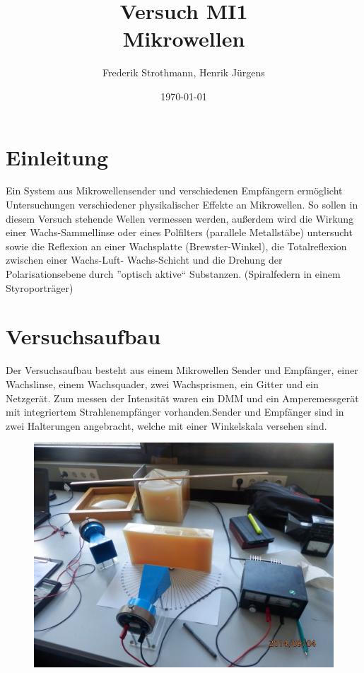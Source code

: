 \documentclass[12pt]{scrartcl}
\title{Versuch MI1\\ Mikrowellen}
\author{Frederik Strothmann, Henrik Jürgens}
\date{\today}
\begin{document}

\maketitle
\tableofcontents
\newpage


\section{Einleitung}

Ein System aus Mikrowellensender und verschiedenen Empfängern ermöglicht Untersuchungen verschiedener physikalischer Effekte an Mikrowellen. So sollen in diesem Versuch stehende Wellen vermessen werden, außerdem wird die Wirkung einer Wachs-Sammellinse oder eines Polfilters (parallele Metallstäbe) untersucht sowie die Reflexion
an einer Wachsplatte (Brewster-Winkel), die Totalreflexion zwischen einer Wachs-Luft-
Wachs-Schicht und die Drehung der Polarisationsebene durch
”optisch aktive“ Substanzen.
(Spiralfedern in einem Styroporträger)

\section{Versuchsaufbau}
Der Versuchsaufbau besteht aus einem Mikrowellen Sender und Empfänger, einer Wachslinse, einem Wachsquader, zwei Wachsprismen, ein Gitter und ein Netzgerät. Zum messen der Intensität waren ein DMM und ein Amperemessgerät mit integriertem Strahlenempfänger vorhanden.Sender und Empfänger sind in zwei Halterungen angebracht, welche mit einer Winkelskala versehen sind.

\begin{figure}[H]
	\centering
	\includegraphics[scale= 0.1]{versuchaufbau.JPG}
	\label{fig:versuchsaufbau}
\end{figure}
\end{document}
